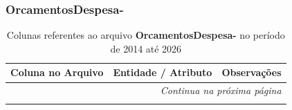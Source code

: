 \vspace{0.5cm}

\subsubsection{OrcamentosDespesa-}

\small
\begin{longtable}{|p{4.0cm}|p{5.0cm}|p{5.5cm}|}
\caption{Colunas referentes ao arquivo \textbf{OrcamentosDespesa-} no período de 2014 até 2026}
\label{tabela-mapeamento-base-grupo-OrcamentosDespesa--periodo-2014-2026} \\ 
    \hline
    \textbf{Coluna no Arquivo} & \textbf{Entidade / Atributo} & \textbf{Observações} \\ \hline
    \endhead

    \hline \multicolumn{3}{r}{\textit{Continua na próxima página}} \\ \hline
    \endfoot

    \hline
    \endlastfoot


\end{longtable}

